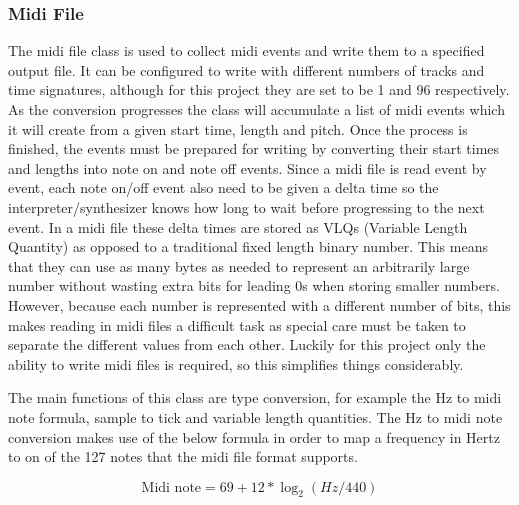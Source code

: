 \documentclass[12pt]{report}
\begin{document}
\subsubsection*{Midi File}
The midi file class is used to collect midi events and write them to a specified output file. It can be configured to write with different numbers of tracks and time signatures, although for this project they are set to be 1 and 96 respectively. As the conversion progresses the class will accumulate a list of midi events which it will create from a given start time, length and pitch. Once the process is finished, the events must be prepared for writing by converting their start times and lengths into note on and note off events. Since a midi file is read event by event, each note on/off event also need to be given a delta time so the interpreter/synthesizer knows how long to wait before progressing to the next event. In a midi file these delta times are stored as VLQs (Variable Length Quantity) as opposed to a traditional fixed length binary number. This means that they can use as many bytes as needed to represent an arbitrarily large number without wasting extra bits for leading 0s when storing smaller numbers. However, because each number is represented with a different number of bits, this makes reading in midi files a difficult task as special care must be taken to separate the different values from each other. Luckily for this project only the ability to write midi files is required, so this simplifies things considerably. 

The main functions of this class are type conversion, for example the Hz to midi note formula, sample to tick and variable length quantities. The Hz to midi note conversion makes use of the below formula in order to map a frequency in Hertz to on of the 127 notes that the midi file format supports.

\begin{equation}
    \text{Midi note} = 69 + 12 * \log_2({Hz}/440)
    \label{eq:Hertz_to_Midi}
\end{equation}
\end{document}
